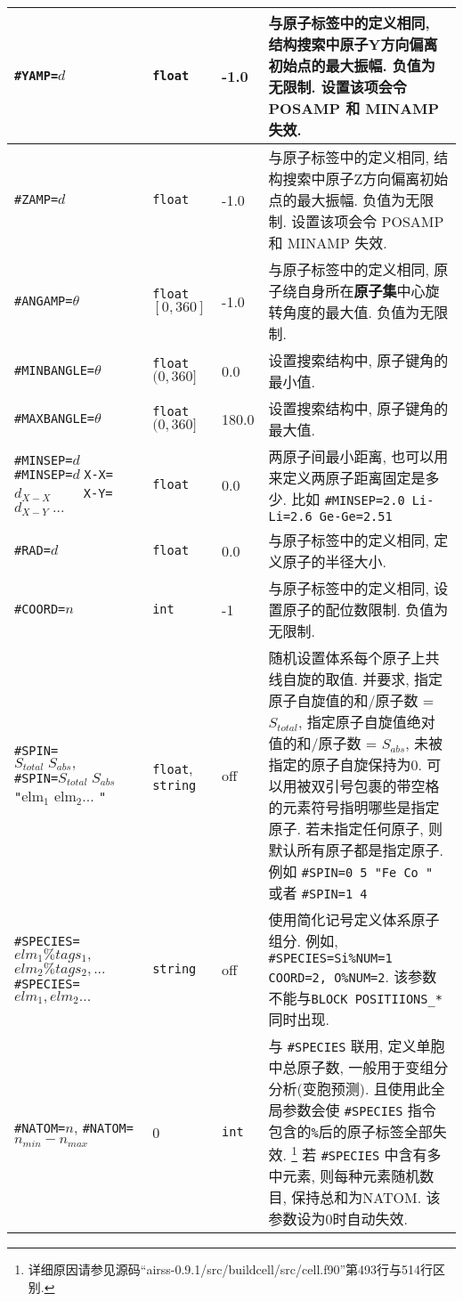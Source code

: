 \documentclass[a4paper, 10pt]{article}
\begin{document}
\begin{center}
\begin{longtable}{m{10em}|m{4em}<{\centering}|m{3em}<{\centering}|m{15em}}
\verb|#YAMP=|\(d\) & \verb|float| & -1.0 & 与原子标签中的定义相同, 结构搜索中原子Y方向偏离初始点的最大振幅. 负值为无限制. 设置该项会令 POSAMP 和 MINAMP 失效.\\
\midrule
\verb|#ZAMP=|\(d\) & \verb|float| & -1.0 & 与原子标签中的定义相同, 结构搜索中原子Z方向偏离初始点的最大振幅. 负值为无限制. 设置该项会令 POSAMP 和 MINAMP 失效.\\
\midrule
\verb|#ANGAMP=|\(\theta\)& \verb|float| \([0,360]\) & -1.0 & 与原子标签中的定义相同, 原子绕自身所在\textbf{原子集}中心旋转角度的最大值. 负值为无限制.\\
\midrule
\verb|#MINBANGLE=|\(\theta\) & \verb|float| \((0,360]\) & 0.0 & 设置搜索结构中, 原子键角的最小值.\\
\midrule
\verb|#MAXBANGLE=|\(\theta\) & \verb|float| \((0,360]\) & 180.0 &设置搜索结构中, 原子键角的最大值.\\
\midrule
\verb|#MINSEP=|\(d\) \verb|#MINSEP=|\(d\;\)\verb|X-X=|\(d_{X−X}\;\)\ \ \  \ \verb|X-Y=|\(d_{X−Y}\;...\) & \verb|float| & 0.0 & 两原子间最小距离, 也可以用来定义两原子距离固定是多少. 比如 \verb|#MINSEP=2.0 Li-Li=2.6 Ge-Ge=2.51|\\
\midrule
\verb|#RAD=|\(d\)& \verb|float|  & 0.0 & 与原子标签中的定义相同, 定义原子的半径大小.\\
\midrule
\verb|#COORD=|\(n\)& \verb|int| & -1 & 与原子标签中的定义相同, 设置原子的配位数限制. 负值为无限制.\\
\midrule
\verb|#SPIN=|\(S_{total}\;S_{abs},\;\;\;\;\;\;\) \verb|#SPIN=|\(S_{total}\;S_{abs}\) \verb|"|elm\(_1\) elm\(_2\)... \verb|"| & \verb|float|,  \verb|string|& off & 随机设置体系每个原子上共线自旋的取值. 并要求, 指定原子自旋值的和/原子数 = \(S_{total}\), 指定原子自旋值绝对值的和/原子数 = \(S_{abs}\), 未被指定的原子自旋保持为0. 可以用被双引号包裹的带空格的元素符号指明哪些是指定原子. 若未指定任何原子, 则默认所有原子都是指定原子. 例如 \verb|#SPIN=0 5 "Fe Co "| 或者 \verb|#SPIN=1 4| \\
\midrule
\verb|#SPECIES=|\(elm_1\%tags_1,\) \(elm_2\%tags_2,...\;\;\;\;\;\;\) \verb|#SPECIES=|\(elm_1,elm_2...\) & \verb|string|  & off & 使用简化记号定义体系原子组分. 例如, \verb|#SPECIES=Si|\verb|%NUM=1| \verb|COORD=2, |\verb|O%NUM=2|. 该参数不能与\verb|BLOCK POSITIIONS_*|同时出现.\\
\midrule
\verb|#NATOM=|\(n\), \hspace{6em}\verb|#NATOM=|\(n_{min}-n_{max}\)  & 0 & \verb|int| & 与 \verb|#SPECIES| 联用, 定义单胞中总原子数, 一般用于变组分分析(变胞预测). 且使用此全局参数会使 \verb|#SPECIES| 指令包含的\verb|%|后的原子标签全部失效. \footnote{详细原因请参见源码``airss-0.9.1/src/buildcell/src/cell.f90''第493行与514行区别.} 若 \verb|#SPECIES| 中含有多中元素, 则每种元素随机数目, 保持总和为NATOM. 该参数设为0时自动失效.\\

\end{longtable}
\end{center}
\end{document}
